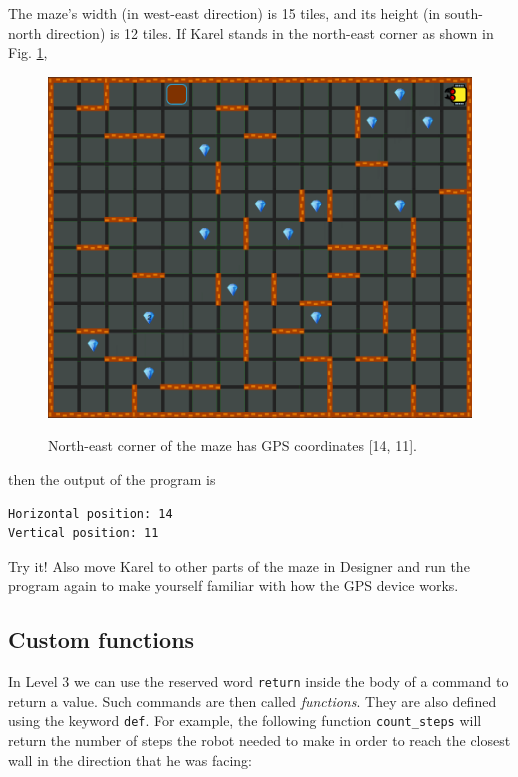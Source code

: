 \documentclass[article,A4,12pt]{llncs}
\begin{document}
\noindent
The maze's width (in west-east direction) is 15 tiles, and its height (in south-north direction) 
is 12 tiles. If Karel stands in the north-east corner as shown in Fig. \ref{fig:gps-101},

\begin{figure}[!ht]
\begin{center}
\includegraphics[height=0.4\textwidth]{img/gps-101.png}
\vspace{-0mm}
\caption{North-east corner of the maze has GPS coordinates [14, 11].}
\vspace{-1cm}
\label{fig:gps-101}
\end{center}
\end{figure}
\newpage
\noindent
then the output of the program is\\

\begin{ybox}
\begin{verbatim}
Horizontal position: 14
Vertical position: 11
\end{verbatim}
\end{ybox}
\vspace{6mm}

\noindent
Try it! Also move Karel to other parts of the maze in Designer and run the program again
to make yourself familiar with how the GPS device works.

\subsection{Custom functions}

In Level 3 we can use the reserved word {\tt return} inside the body of
a command to return a value. Such commands are then called {\em functions}. 
They are also defined using the keyword {\tt def}. For example, the following function
{\tt count\_steps} will return the number of steps the robot needed to 
make in order to reach the closest wall in the direction that he was facing:\\
\end{document}

